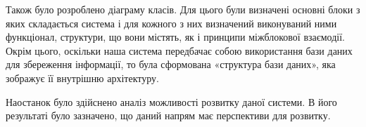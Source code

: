 \documentclass[14pt,a4paper,oneside]{extbook}
\begin{document}
	Також було розроблено діаграму класів. Для цього були визначені основні блоки з яких складається система і для кожного з них визначений виконуваний ними функціонал, структури, що вони містять, як і принципи міжблокової взаємодії. Окрім цього, оскільки наша система передбачає собою використання бази даних для збереження інформації, то була сформована «структура бази даних», яка зображує  її внутрішню архітектуру.


	Наостанок було здійснено аналіз можливості розвитку даної системи. В його результаті було зазначено, що даний напрям має перспективи для розвитку.

\end{document}

